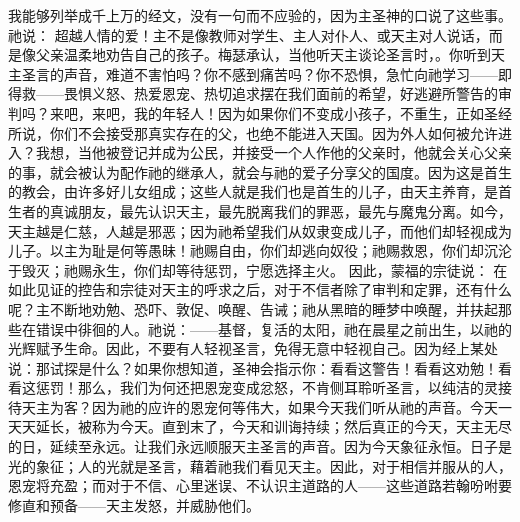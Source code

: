 我能够列举成千上万的经文，没有一句而不应验的，因为主圣神的口说了这些事。祂说： 超越人情的爱！主不是像教师对学生、主人对仆人、或天主对人说话，而是像父亲温柔地劝告自己的孩子。梅瑟承认，当他听天主谈论圣言时，。你听到天主圣言的声音，难道不害怕吗？你不感到痛苦吗？你不恐惧，急忙向祂学习——即得救——畏惧义怒、热爱恩宠、热切追求摆在我们面前的希望，好逃避所警告的审判吗？来吧，来吧，我的年轻人！因为如果你们不变成小孩子，不重生，正如圣经所说，你们不会接受那真实存在的父，也绝不能进入天国。因为外人如何被允许进入？我想，当他被登记并成为公民，并接受一个人作他的父亲时，他就会关心父亲的事，就会被认为配作祂的继承人，就会与祂的爱子分享父的国度。因为这是首生的教会，由许多好儿女组成；这些人就是我们也是首生的儿子，由天主养育，是首生者的真诚朋友，最先认识天主，最先脱离我们的罪恶，最先与魔鬼分离。如今，天主越是仁慈，人越是邪恶；因为祂希望我们从奴隶变成儿子，而他们却轻视成为儿子。以主为耻是何等愚昧！祂赐自由，你们却逃向奴役；祂赐救恩，你们却沉沦于毁灭；祂赐永生，你们却等待惩罚，宁愿选择主火。 因此，蒙福的宗徒说： 在如此见证的控告和宗徒对天主的呼求之后，对于不信者除了审判和定罪，还有什么呢？主不断地劝勉、恐吓、敦促、唤醒、告诫；祂从黑暗的睡梦中唤醒，并扶起那些在错误中徘徊的人。祂说：——基督，复活的太阳，祂在晨星之前出生，以祂的光辉赋予生命。因此，不要有人轻视圣言，免得无意中轻视自己。因为经上某处说：那试探是什么？如果你想知道，圣神会指示你：看看这警告！看看这劝勉！看看这惩罚！那么，我们为何还把恩宠变成忿怒，不肯侧耳聆听圣言，以纯洁的灵接待天主为客？因为祂的应许的恩宠何等伟大，如果今天我们听从祂的声音。今天一天天延长，被称为今天。直到末了，今天和训诲持续；然后真正的今天，天主无尽的日，延续至永远。让我们永远顺服天主圣言的声音。因为今天象征永恒。日子是光的象征；人的光就是圣言，藉着祂我们看见天主。因此，对于相信并服从的人，恩宠将充盈；而对于不信、心里迷误、不认识主道路的人——这些道路若翰吩咐要修直和预备——天主发怒，并威胁他们。\par


